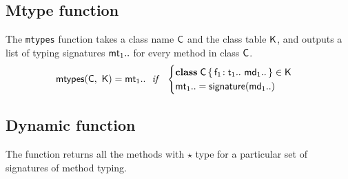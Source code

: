 \documentclass[acmlarge, anonymous, authordraft, review]{acmart} %
\begin{document}
\begin{mathpar}





\end{mathpar}

\subsection{Mtype function}

The \texttt{mtypes} function takes a class name $\C$ and the class table
$\K$, and outputs a list of typing signatures $\mt[1]..$ for every method in
class $\C$. \\


\begin{equation*}
\classoff\C\K = \mt[1].. ~~\mathit{if}~~ \begin{cases}

 \Class \C {{\Fdef{\f[1]}{\t[1]}..}}{\md[1]..} \in \K\\
\mt[1].. = \sign{\md[1]..} 

\end{cases}
\end{equation*}


\subsection{Dynamic function}

The  function returns all the methods with $\star$ type for a particular set of 
signatures of method typing.
\end{document}
